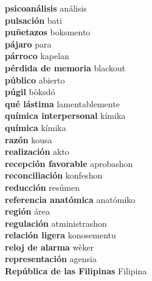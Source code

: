 \textbf{ psicoanálisis  } análisis \\
\textbf{ pulsación  } bati \\
\textbf{ puñetazos  } boksmento \\
\textbf{ pájaro  } para \\
\textbf{ párroco  } kapelan \\
\textbf{ pérdida de memoria  } blackout \\
\textbf{ público  } abierto \\
\textbf{ púgil  } bòksdó \\
\textbf{ qué lástima  } lamentablemente \\
\textbf{ química interpersonal  } kímika \\
\textbf{ química  } kímika \\
\textbf{ razón  } kousa \\
\textbf{ realización  } akto \\
\textbf{ recepción favorable  } aprobashon \\
\textbf{ reconciliación  } konfeshon \\
\textbf{ reducción  } resúmen \\
\textbf{ referencia anatómica  } anatómiko \\
\textbf{ región  } área \\
\textbf{ regulación  } atministrashon \\
\textbf{ relación ligera  } konosementu \\
\textbf{ reloj de alarma  } wèker \\
\textbf{ representación  } agensia \\
\textbf{ República de las Filipinas  } Filipina \\
